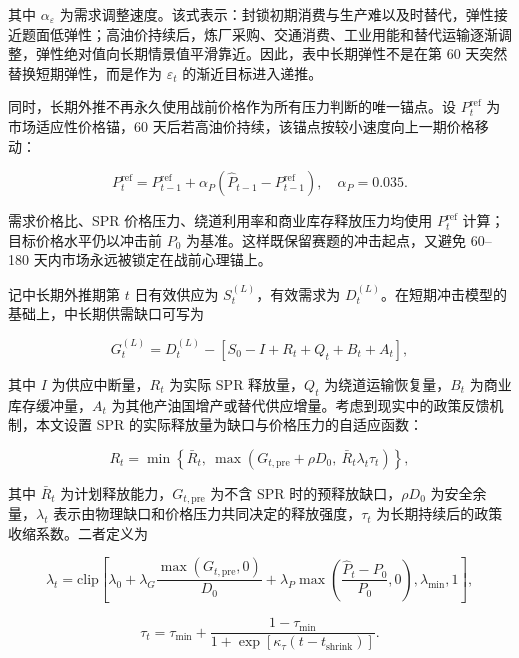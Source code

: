 其中 \(\alpha_\varepsilon\) 为需求调整速度。该式表示：封锁初期消费与生产难以及时替代，弹性接近题面低弹性；高油价持续后，炼厂采购、交通消费、工业用能和替代运输逐渐调整，弹性绝对值向长期情景值平滑靠近。因此，表中长期弹性不是在第 60 天突然替换短期弹性，而是作为 \(\varepsilon_t\) 的渐近目标进入递推。

同时，长期外推不再永久使用战前价格作为所有压力判断的唯一锚点。设 \(P_t^{\mathrm{ref}}\) 为市场适应性价格锚，60 天后若高油价持续，该锚点按较小速度向上一期价格移动：

\begin{equation}
P_t^{\mathrm{ref}}
=
P_{t-1}^{\mathrm{ref}}
+
\alpha_P(\hat P_{t-1}-P_{t-1}^{\mathrm{ref}}),
\quad \alpha_P=0.035 .
\end{equation}

需求价格比、SPR 价格压力、绕道利用率和商业库存释放压力均使用 \(P_t^{\mathrm{ref}}\) 计算；目标价格水平仍以冲击前 \(P_0\) 为基准。这样既保留赛题的冲击起点，又避免 60--180 天内市场永远被锁定在战前心理锚上。

记中长期外推期第 $t$ 日有效供应为 $S_t^{(L)}$，有效需求为 $D_t^{(L)}$。在短期冲击模型的基础上，中长期供需缺口可写为

\begin{equation}
G_t^{(L)}
=
D_t^{(L)}
-
\left[
S_0-I+R_t+Q_t+B_t+A_t
\right],
\end{equation}

其中 $I$ 为供应中断量，$R_t$ 为实际 SPR 释放量，$Q_t$ 为绕道运输恢复量，$B_t$ 为商业库存缓冲量，$A_t$ 为其他产油国增产或替代供应增量。考虑到现实中的政策反馈机制，本文设置 SPR 的实际释放量为缺口与价格压力的自适应函数：

\begin{equation}
R_t=\min\left\{\bar R_t,\ \max\left(G_{t,\mathrm{pre}}+\rho D_0,\ \bar R_t \lambda_t \tau_t\right)\right\},
\end{equation}

其中 $\bar R_t$ 为计划释放能力，$G_{t,\mathrm{pre}}$ 为不含 SPR 时的预释放缺口，$\rho D_0$ 为安全余量，$\lambda_t$ 表示由物理缺口和价格压力共同决定的释放强度，$\tau_t$ 为长期持续后的政策收缩系数。二者定义为

\begin{equation}
\lambda_t
=
\mathrm{clip}\left[
\lambda_0
+\lambda_G\frac{\max(G_{t,\mathrm{pre}},0)}{D_0}
+\lambda_P\max\left(\frac{\hat P_t-P_0}{P_0},0\right),
\lambda_{\min},1
\right],
\end{equation}

\begin{equation}
\tau_t
=
\tau_{\min}
+
\frac{1-\tau_{\min}}
{1+\exp\left[\kappa_\tau(t-t_{\mathrm{shrink}})\right]} .
\end{equation}

